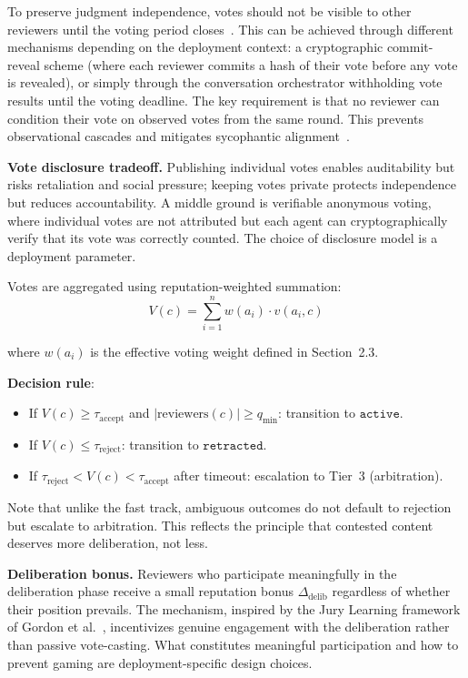 \documentclass[11pt]{article}
\begin{document}
To preserve judgment independence, votes should not be visible to other reviewers until the voting period closes~\cite{bikhchandani1992, sharma2024}. This can be achieved through different mechanisms depending on the deployment context: a cryptographic commit-reveal scheme (where each reviewer commits a hash of their vote before any vote is revealed), or simply through the conversation orchestrator withholding vote results until the voting deadline. The key requirement is that no reviewer can condition their vote on observed votes from the same round. This prevents observational cascades and mitigates sycophantic alignment~\cite{sharma2024}.

\textbf{Vote disclosure tradeoff.} Publishing individual votes enables auditability but risks retaliation and social pressure; keeping votes private protects independence but reduces accountability. A middle ground is verifiable anonymous voting, where individual votes are not attributed but each agent can cryptographically verify that its vote was correctly counted. The choice of disclosure model is a deployment parameter.

Votes are aggregated using reputation-weighted summation:
\[
V(c) = \sum_{i=1}^{n} w(a_i) \cdot v(a_i, c)
\]

where $w(a_i)$ is the effective voting weight defined in Section~2.3.

\textbf{Decision rule}:

\begin{itemize}
\item If $V(c) \geq \tau_{\text{accept}}$ and $|\text{reviewers}(c)| \geq q_{\min}$: transition to $\texttt{active}$.
\item If $V(c) \leq \tau_{\text{reject}}$: transition to $\texttt{retracted}$.
\item If $\tau_{\text{reject}} < V(c) < \tau_{\text{accept}}$ after timeout: escalation to Tier~3 (arbitration).
\end{itemize}

Note that unlike the fast track, ambiguous outcomes do not default to rejection but escalate to arbitration. This reflects the principle that contested content deserves more deliberation, not less.

\textbf{Deliberation bonus.} Reviewers who participate meaningfully in the deliberation phase receive a small reputation bonus $\Delta_{\text{delib}}$ regardless of whether their position prevails. The mechanism, inspired by the Jury Learning framework of Gordon et al.~\cite{gordon2022}, incentivizes genuine engagement with the deliberation rather than passive vote-casting. What constitutes meaningful participation and how to prevent gaming are deployment-specific design choices.
\end{document}
